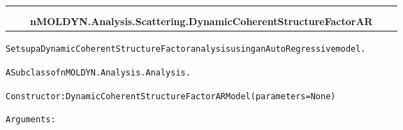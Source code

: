     \label{nMOLDYN:Analysis:Scattering:DynamicCoherentStructureFactorAR}
\begin{tabular}{cccccc}
\multicolumn{2}{r}{\settowidth{\BCL}{nMOLDYN.Analysis.Analysis.Analysis}\multirow{2}{\BCL}{nMOLDYN.Analysis.Analysis.Analysis}}
&&
  \\\cline{3-3}
  &&\multicolumn{1}{c|}{}
&&
  \\
&&\multicolumn{2}{l}{\textbf{nMOLDYN.Analysis.Scattering.DynamicCoherentStructureFactorAR}}
\end{tabular}

\begin{alltt}
Sets up a Dynamic Coherent Structure Factor analysis using an Auto Regressive model.

A Subclass of nMOLDYN.Analysis.Analysis. 

Constructor: DynamicCoherentStructureFactorARModel({\textbar}parameters{\textbar} = None)

Arguments:


\end{alltt}
